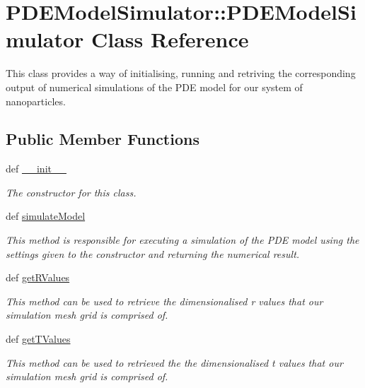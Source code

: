 \hypertarget{class_p_d_e_model_simulator_1_1_p_d_e_model_simulator}{
\section{PDEModelSimulator::PDEModelSimulator Class Reference}
\label{class_p_d_e_model_simulator_1_1_p_d_e_model_simulator}
}


This class provides a way of initialising, running and retriving the corresponding output of numerical simulations of the PDE model for our system of nanoparticles.  


\subsection*{Public Member Functions}
\begin{DoxyCompactItemize}
\item 
def \hyperlink{class_p_d_e_model_simulator_1_1_p_d_e_model_simulator_a9b7dbf0e8912852b309c38c70520e6d3}{\_\-\_\-init\_\-\_\-}
\begin{DoxyCompactList}\small\item\em The constructor for this class. \item\end{DoxyCompactList}\item 
def \hyperlink{class_p_d_e_model_simulator_1_1_p_d_e_model_simulator_ab4ada5eadc3ef2e6b3c2b89d0c53a763}{simulateModel}
\begin{DoxyCompactList}\small\item\em This method is responsible for executing a simulation of the PDE model using the settings given to the constructor and returning the numerical result. \item\end{DoxyCompactList}\item 
def \hyperlink{class_p_d_e_model_simulator_1_1_p_d_e_model_simulator_a1106df8f14189cc377e92aba14acf8ee}{getRValues}
\begin{DoxyCompactList}\small\item\em This method can be used to retrieve the dimensionalised r values that our simulation mesh grid is comprised of. \item\end{DoxyCompactList}\item 
def \hyperlink{class_p_d_e_model_simulator_1_1_p_d_e_model_simulator_a5f6cd9ae1915ce5228fc462e95938476}{getTValues}
\begin{DoxyCompactList}\small\item\em This method can be used to retrieved the the dimensionalised t values that our simulation mesh grid is comprised of. \item\end{DoxyCompactList}\end{DoxyCompactItemize}


